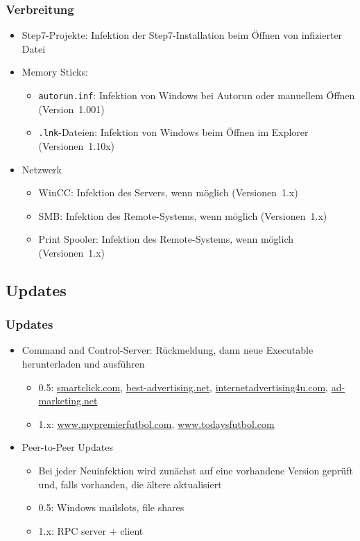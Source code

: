\documentclass{beamer}
\begin{document}
\begin{frame}
  \frametitle{Verbreitung}
  \begin{itemize}
    \item Step7-Projekte: Infektion der Step7-Installation beim Öffnen von infizierter Datei
    \item Memory Sticks:
      \begin{itemize}
        \item \texttt{autorun.inf}: Infektion von Windows bei Autorun oder manuellem Öffnen (Version~1.001)
        \item \texttt{.lnk}-Dateien: Infektion von Windows beim Öffnen im Explorer (Versionen~1.10x)
      \end{itemize}
    \item Netzwerk
      \begin{itemize}
        \item WinCC: Infektion des Servers, wenn möglich (Versionen~1.x)
        \item SMB: Infektion des Remote-Systems, wenn möglich (Versionen~1.x)
        \item Print Spooler: Infektion des Remote-Systems, wenn möglich (Versionen~1.x)
      \end{itemize}
  \end{itemize}
\end{frame}

\subsection{Updates}

\begin{frame}
  \frametitle{Updates}
  \begin{itemize}
    \item Command and Control-Server: Rückmeldung, dann neue Executable herunterladen und ausführen
      \begin{itemize}
        \item 0.5: \url{smartclick.com}, \url{best-advertising.net}, \url{internetadvertising4u.com}, \url{ad-marketing.net}
        \item 1.x: \url{www.mypremierfutbol.com}, \url{www.todaysfutbol.com}
      \end{itemize}
    \item Peer-to-Peer Updates
      \begin{itemize}
        \item Bei jeder Neuinfektion wird zunächst auf eine vorhandene Version geprüft und, falls vorhanden, die ältere aktualisiert
        \item 0.5: Windows mailslots, file shares
        \item 1.x: RPC server + client
      \end{itemize}
  \end{itemize}
\end{frame}
\end{document}

